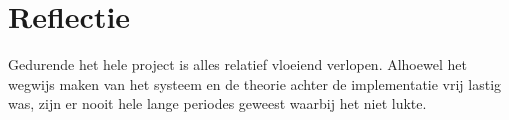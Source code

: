 




\section{Reflectie}


Gedurende het hele project is alles relatief vloeiend verlopen. Alhoewel het wegwijs maken van het systeem en de theorie achter de implementatie vrij lastig was, zijn er nooit hele lange periodes geweest waarbij het niet lukte.



